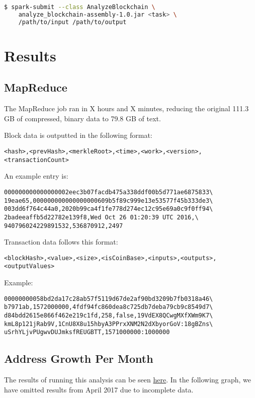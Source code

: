 \documentclass[9pt,twocolumn,twoside]{idsi}
\begin{document}
\begin{lstlisting}[language=bash]
 $ spark-submit --class AnalyzeBlockchain \
    analyze_blockchain-assembly-1.0.jar <task> \
    /path/to/input /path/to/output
\end{lstlisting}

\section{Results}
\subsection{MapReduce}
The MapReduce job ran in X hours and X minutes, reducing the original 111.3 GB of compressed, binary data to 79.8 GB of text.

Block data is outputted in the following format:
\begin{lstlisting}[language=text]
<hash>,<prevHash>,<merkleRoot>,<time>,<work>,<version>,
<transactionCount>
\end{lstlisting}

An example entry is:
\begin{lstlisting}[language=text]
000000000000000002eec3b07facdb475a338ddf00b5d771ae6875833\
19eae65,000000000000000000609b5f89c999e13e53577f45b333de3\
003dd6f764c44a0,2020b99ca4f1fe778d274ec12c95e69a0c9f0ff94\
2badeeaffb5d22782e139f8,Wed Oct 26 01:20:39 UTC 2016,\
940796024229891532,536870912,2497
\end{lstlisting}

Transaction data follows this format:
\begin{lstlisting}[language=text]
<blockHash>,<value>,<size>,<isCoinBase>,<inputs>,<outputs>,
<outputValues>
\end{lstlisting}

Example:
\begin{lstlisting}[language=text]
00000000058bd2da17c28ab57f5119d67de2af90bd3209b7fb0318a46\
b7971ab,1572000000,4fdf94fc860dea8c725db7deba79cb9c8549d7\
d84bdd2615e866f462e219c1fd,258,false,19VdEX8QCwgMXfXWm9K7\
kmL8p121jRab9V,1CnU8X8u15hbyA3PPrxXNM2N2dXbyorGoV:18gBZns\
uSrhYLjvPUgwvDUJmksfREUGBTT,1571000000:1000000
\end{lstlisting}

\subsection{Address Growth Per Month}

The results of running this analysis can be seen \href{https://google.com}{here}. In the following graph, we have omitted results from April 2017 due to incomplete data.
\end{document}
